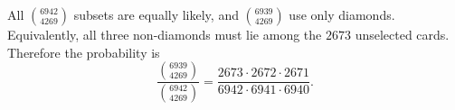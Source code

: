 All $\binom{6942}{4269}$ subsets are equally likely, and $\binom{6939}{4269}$ use only diamonds. Equivalently, all three non-diamonds must lie among the $2673$ unselected cards. Therefore the probability is\[\boxed{\dfrac{\binom{6939}{4269}}{\binom{6942}{4269}}=\dfrac{2673\cdot2672\cdot2671}{6942\cdot6941\cdot6940}}.\]
